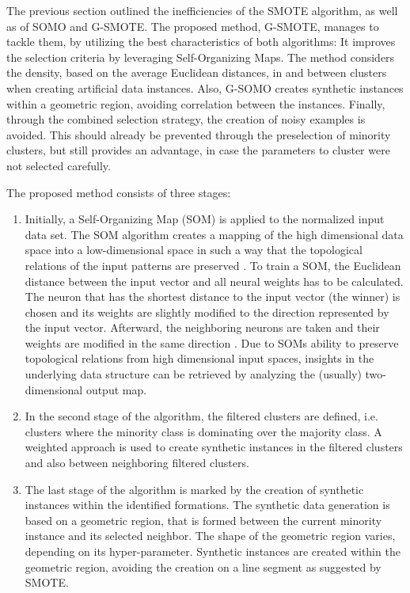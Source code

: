 \documentclass[parskip=full]{scrartcl}
\begin{document}
The previous section outlined the inefficiencies of the SMOTE algorithm, as well
as of SOMO and G-SMOTE. The proposed method, G-SMOTE, manages to tackle them, by
utilizing the best characteristics of both algorithms: It improves the selection
criteria by leveraging Self-Organizing Maps. The method considers the density,
based on the average Euclidean distances, in and between clusters when creating
artificial data instances. Also, G-SOMO creates synthetic instances within a
geometric region, avoiding correlation between the instances. Finally, through
the combined selection strategy, the creation of noisy examples is avoided. This
should already be prevented through the preselection of minority clusters, but
still provides an advantage, in case the parameters to cluster were not selected
carefully.

The proposed method consists of three stages:

\begin{enumerate}

	\item Initially, a Self-Organizing Map (SOM) is applied to the normalized
		  input data set. The SOM algorithm creates a mapping of the high
		  dimensional data space into a low-dimensional space in such a way that
		  the topological relations of the input patterns are preserved
		  \cite{Kker2007}. To train a SOM, the Euclidean distance between the
		  input vector and all neural weights has to be calculated. The neuron
		  that has the shortest distance to the input vector (the winner) is
		  chosen and its weights are slightly modified to the direction
		  represented by the input vector. Afterward, the neighboring neurons
		  are taken and their weights are modified in the same direction
		  \cite{Brocki2007}. Due to SOMs ability to preserve topological
		  relations from high dimensional input spaces, insights in the
		  underlying data structure can be retrieved by analyzing the (usually)
		  two-dimensional output map. 
	
	\item In the second stage of the algorithm, the filtered clusters are
		  defined, i.e. clusters where the minority class is dominating over the
		  majority class. A weighted approach is used to create synthetic
		  instances in the filtered clusters and also between neighboring
		  filtered clusters. 
		  
	\item The last stage of the algorithm is marked by the creation of synthetic
		  instances within the identified formations. The synthetic data
		  generation is based on a geometric region, that is formed between the
		  current minority instance and its selected neighbor. The shape of the
		  geometric region varies, depending on its hyper-parameter. Synthetic
		  instances are created within the geometric region, avoiding the
		  creation on a line segment as suggested by SMOTE.

\end{enumerate}
\end{document}
